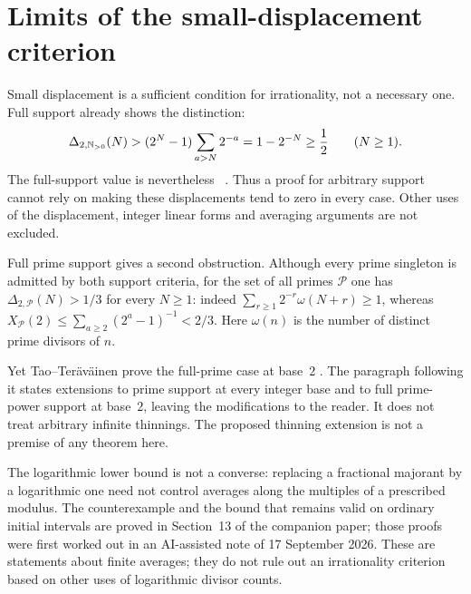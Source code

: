 \documentclass[11pt]{article}
\begin{document}
\section{Limits of the small-displacement criterion}\label{sec:map}
Small displacement is a sufficient condition for irrationality, not a
necessary one. Full support already shows the distinction:
\[
 \Delta_{2,\mathbb{N}_{>0}}(N)
 >(2^N-1)\sum_{a>N}2^{-a}=1-2^{-N}\ge\frac12
 \qquad(N\ge1).
\]
The full-support value is nevertheless
~\cite{erdos1948}.
Thus a proof for arbitrary support cannot rely on making these
displacements tend to zero in every case. Other uses of the displacement,
integer linear forms and averaging arguments are not excluded.

Full prime support gives a second obstruction. Although every prime
singleton is admitted by both support criteria, for the set of all
primes $\mathcal P$ one has
$\Delta_{2,\mathcal P}(N)>1/3$ for every $N\ge1$: indeed
$\sum_{r\ge1}2^{-r}\omega(N+r)\ge1$, whereas
$X_{\mathcal P}(2)\le\sum_{a\ge2}(2^a-1)^{-1}<2/3$.
Here $\omega(n)$ is the number of distinct prime divisors of $n$.


Yet Tao--Ter\"av\"ainen prove the full-prime case at base~$2$
\cite[Theorem~1.3, p.~4]{taoteravainen2025}.  The paragraph following it
states extensions to prime support at every integer base and to full
prime-power support at base~$2$, leaving the modifications to the reader.
It does not treat arbitrary infinite thinnings.  The proposed thinning
extension is not a premise of any theorem here.


The logarithmic lower bound is not a converse: replacing a fractional
majorant by a logarithmic one need not control averages along the
multiples of a prescribed modulus.  The counterexample and the bound that remains valid on ordinary initial
intervals are proved in
{Section~13 of the companion paper}; those proofs were first worked out in
an AI-assisted note of 17 September 2026. These are statements about finite
averages; they do not rule out an irrationality criterion based on other
uses of logarithmic divisor counts.
\end{document}
